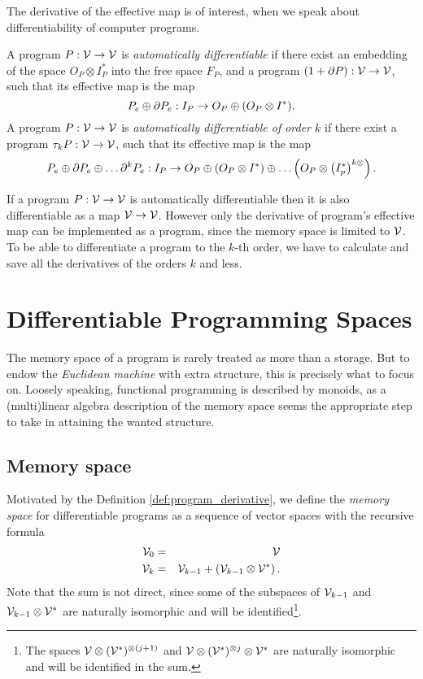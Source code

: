 The derivative of the effective map is of interest, when we speak about
differentiability of computer programs. 
\begin{definition}
  \label{def:program_derivative}
  A program $P:\mathcal{V}\to \mathcal{V}$ is \emph{automatically differentiable} if there exist
  an embedding of the space $O_P\otimes I_P^*$ into the free space $F_P$, and a program $(1+\partial P):\mathcal{V}\to \mathcal{V}$,
  such that its effective map is the map
  \begin{equation}
    \label{eq:program_derivative}
    P_e\oplus \partial P_e:I_P\rightarrow O_P\oplus (O_P\otimes I^*).
  \end{equation}
  A program $P:\mathcal{V}\to \mathcal{V}$ is \emph{automatically differentiable of order $k$}
  if there exist a program $\tau_k P:\mathcal{V}\to \mathcal{V}$,
  such that its effective map is the map
  \begin{equation}
    \label{eq:program_derivative_higher}
    P_e\oplus \partial P_e\oplus \ldots \partial^k P_e:I_P\rightarrow O_P\oplus \left(O_P\otimes I^*\right)\oplus\ldots \left( O_P\otimes \left( I_p^*\right)^{k\otimes} \right).
  \end{equation}
\end{definition}

If a program $P:\mathcal{V}\to \mathcal{V}$ is automatically differentiable then it is also
differentiable as a map $\mathcal{V}\to\mathcal{V}$. However only the derivative of program's
effective map can be implemented as a program, since the memory space is limited to $\mathcal{V}$. 
To be able to differentiate a program to the $k$-th order, we have to calculate
and save all the derivatives of the orders $k$ and less.

\section{Differentiable Programming Spaces}

The memory space of a program is rarely treated as more than a storage. But to endow the \emph{Euclidean machine} with extra structure, this is precisely what to focus on. Loosely speaking, functional programming is described by monoids, as a (multi)linear algebra description of the memory space seems the appropriate step to take in attaining the wanted structure.

\subsection{Memory space}

Motivated by the Definition
\ref{def:program_derivative}, we define
the \emph{memory space} for differentiable programs  as a sequence of vector spaces with
the recursive formula
\begin{eqnarray}
  \mathcal{V}_0 &=& \mathcal{V}\\
  \label{eq:universal_space}
  \mathcal{V}_k &=& \mathcal{V}_{k-1}+\left(\mathcal{V}_{k-1}\otimes \mathcal{V}^*\right).
\end{eqnarray}
Note that the sum is not direct, since some of the subspaces of $\mathcal{V}_{k-1}$ and
$\mathcal{V}_{k-1}\otimes \mathcal{V}^*$ are naturally isomorphic and will be
identified\footnote{The spaces $\mathcal{V}\otimes(\mathcal{V}^*)^{\otimes (j+1)}$ and
  $\mathcal{V}\otimes (\mathcal{V}^*)^{\otimes j}\otimes \mathcal{V}^*$ are naturally isomorphic and
  will be identified in the sum.
}.

